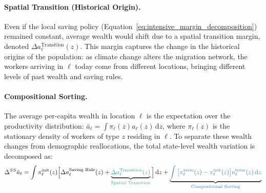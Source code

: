 \documentclass[11pt, a4paper]{article}
\begin{document}
\paragraph{Spatial Transition (Historical Origin).}
Even if the local saving policy (Equation~\ref{eq:intensive_margin_decomposition}) remained constant, average wealth would shift due to a spatial transition margin, denoted $\Delta a_\ell^{\text{Transition}}(z)$. This margin captures the change in the historical origins of the population: as climate change alters the migration network, the workers arriving in $\ell$ today come from different locations, bringing different levels of past wealth and saving rules.
\paragraph{Compositional Sorting.}
The average per-capita wealth in location $\ell$ is the expectation over the productivity distribution: $\bar{a}_\ell = \int \pi_\ell(z) a_\ell(z)\,\mathrm{d}z$, where $\pi_\ell(z)$ is the stationary density of workers of type $z$ residing in $\ell$. To separate these wealth changes from demographic reallocations, the total state-level wealth variation is decomposed as:
\begin{equation}
    \Delta^{SS} \bar{a}_\ell = \int \pi_\ell^{\text{init}}(z) \Big[\Delta a_\ell^{\text{Saving Rule}}(z) + \underbrace{\textcolor{lightemerald}{\Delta a_\ell^{\text{Transition}}(z)}}_{\textcolor{lightemerald}{\text{Spatial Transition}}} \Big]\,\mathrm{d}z + \underbrace{\textcolor{cobaltblue}{\int \big[\pi_\ell^{\text{term}}(z) - \pi_\ell^{\text{init}}(z) \big] a_\ell^{\text{term}}(z)\,\mathrm{d}z}}_{\textcolor{cobaltblue}{\text{Compositional Sorting}}}
    \label{eq:wealth_decomposition}
\end{equation}
\end{document}
